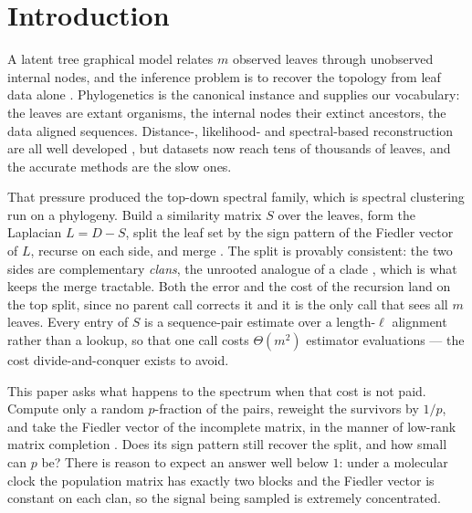 \section{Introduction}\label{sec:intro}

A latent tree graphical model relates $m$ observed leaves through unobserved
internal nodes, and the inference problem is to recover the topology from leaf
data alone \cite{aizenbud2023spectral, semple2003phylogenetics}. Phylogenetics is
the canonical instance and supplies our vocabulary: the leaves are extant
organisms, the internal nodes their extinct ancestors, the data aligned
sequences. Distance-, likelihood- and spectral-based reconstruction are all well
developed \cite{saitou1987neighbor, erdos1999logs, jaffe2021spectral,
mossel2005learning}, but datasets now reach tens of thousands of leaves, and the
accurate methods are the slow ones.

That pressure produced the top-down spectral family, which is spectral clustering
run on a phylogeny. Build a similarity matrix $S$ over the leaves, form the
Laplacian $L=D-S$, split the leaf set by the sign pattern of the Fiedler vector
of $L$, recurse on each side, and merge \cite{aizenbud2023spectral,
vonluxburg2007tutorial, fiedler1975property}. The split is provably consistent:
the two sides are complementary \emph{clans}, the unrooted analogue of a clade
\cite{wilkinson2007clades}, which is what keeps the merge tractable. Both the
error and the cost of the recursion land on the top split, since no parent call
corrects it and it is the only call that sees all $m$ leaves. Every entry of $S$
is a sequence-pair estimate over a length-$\ell$ alignment rather than a lookup,
so that one call costs $\Theta(m^2)$ estimator evaluations --- the cost
divide-and-conquer exists to avoid.

This paper asks what happens to the spectrum when that cost is not paid. Compute
only a random $p$-fraction of the pairs, reweight the survivors by $1/p$, and
take the Fiedler vector of the incomplete matrix, in the manner of low-rank
matrix completion \cite{candes2008exact, candes2009power, candes2009matrix,
recht2011simpler, keshavan2010matrix, bhojanapalli2014universal}. Does its sign
pattern still recover the split, and how small can $p$ be? There is reason to
expect an answer well below $1$: under a molecular clock the population matrix
has exactly two blocks and the Fiedler vector is constant on each clan, so the
signal being sampled is extremely concentrated.


